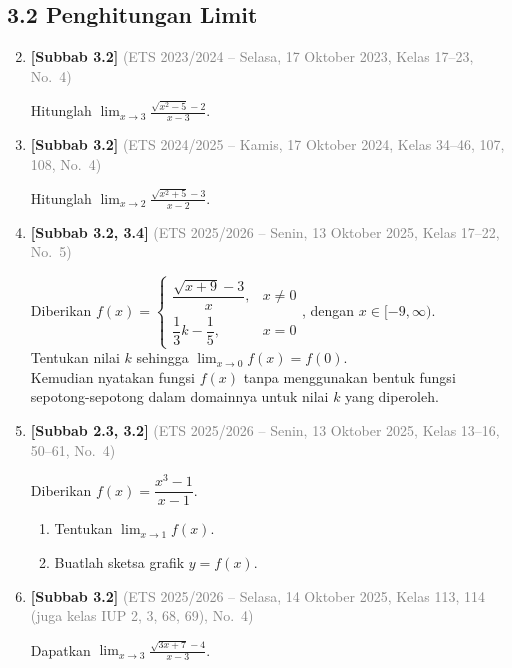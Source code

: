 \documentclass[10pt,openany,a4paper]{article}
\theoremstyle{definition}
\theoremstyle{definition}
\theoremstyle{plain}
\begin{document}
\subsection*{3.2 \quad Penghitungan Limit}
\begin{enumerate}
\setcounter{enumi}{1}
    \item \textbf{[Subbab 3.2]} {\footnotesize\textcolor{gray}{(ETS 2023/2024 -- Selasa, 17 Oktober 2023, Kelas 17--23, No.~4)}}\par
    Hitunglah $\displaystyle\lim_{x\to 3}\frac{\sqrt{x^2-5}-2}{x-3}$.

    \item \textbf{[Subbab 3.2]} {\footnotesize\textcolor{gray}{(ETS 2024/2025 -- Kamis, 17 Oktober 2024, Kelas 34--46, 107, 108, No.~4)}}\par
    Hitunglah $\displaystyle\lim_{x\to 2}\frac{\sqrt{x^2+5}-3}{x-2}$.

    \item \textbf{[Subbab 3.2, 3.4]} {\footnotesize\textcolor{gray}{(ETS 2025/2026 -- Senin, 13 Oktober 2025, Kelas 17--22, No.~5)}}\par
    Diberikan $f(x)=\begin{cases}
        \dfrac{\sqrt{x+9}-3}{x}, &x\neq 0\\[2mm]
        \dfrac{1}{3}k-\dfrac{1}{5}, &x=0
    \end{cases}$, dengan $x\in [-9,\infty)$.\\
    Tentukan nilai $k$ sehingga $\displaystyle\lim_{x\to 0}f(x)=f(0)$.\\
    Kemudian nyatakan fungsi $f(x)$ tanpa menggunakan bentuk fungsi sepotong-sepotong dalam domainnya untuk nilai $k$ yang diperoleh.

    \item \textbf{[Subbab 2.3, 3.2]} {\footnotesize\textcolor{gray}{(ETS 2025/2026 -- Senin, 13 Oktober 2025, Kelas 13--16, 50--61, No.~4)}}\par
    Diberikan $f(x)=\dfrac{x^3-1}{x-1}$.
    \begin{enumerate}
        \item Tentukan $\displaystyle\lim_{x\to 1}f(x)$.
        \item Buatlah sketsa grafik $y=f(x)$.
    \end{enumerate}

    \item \textbf{[Subbab 3.2]} {\footnotesize\textcolor{gray}{(ETS 2025/2026 -- Selasa, 14 Oktober 2025, Kelas 113, 114 (juga kelas IUP 2, 3, 68, 69), No.~4)}}\par
    Dapatkan $\displaystyle \lim_{x\to 3} \frac{\sqrt{3x+7}-4}{x-3}$.


\end{enumerate}
\end{document}
